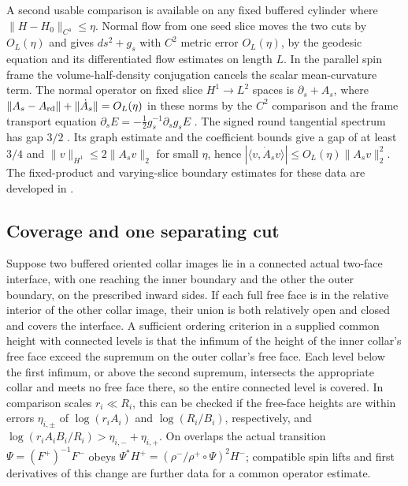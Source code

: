 \documentclass[11pt]{article}
\theoremstyle{definition}
\theoremstyle{remark}
\begin{document}
A second usable comparison is available on any fixed buffered cylinder where \(\|H-H_0\|_{C^4}\le\eta\). Normal flow from one seed slice moves the two cuts by \(O_L(\eta)\) and gives \(ds^2+g_s\) with \(C^2\) metric error \(O_L(\eta)\), by the geodesic equation and its differentiated flow estimates on length \(L\). In the parallel spin frame the volume-half-density conjugation cancels the scalar mean-curvature term. The normal operator on fixed slice \(H^1\to L^2\) spaces is \(\partial_s+A_s\), where \(\|A_s-A_{\rm rd}\|+\|\dot A_s\|=O_L(\eta)\) in these norms by the \(C^2\) comparison and the frame transport equation \(\partial_s E=-\tfrac12g_s^{-1}\partial_s g_s E\) \cite[(3.6), (4.1) and \S5]{BaerGauduchonMoroianu2005Cylinders}. The signed round tangential spectrum has gap \(3/2\) \cite[Theorem 1]{Bar1996SphereDirac}. Its graph estimate and the coefficient bounds give a gap of at least \(3/4\) and \(\|v\|_{H^1}\le2\|A_sv\|_2\) for small \(\eta\), hence \(|\langle v,\dot A_s v\rangle|\le O_L(\eta)\|A_sv\|_2^2\). The fixed-product and varying-slice boundary estimates for these data are developed in \cite{Baker2026DiracTransmission}.

\subsection{Coverage and one separating cut}

Suppose two buffered oriented collar images lie in a connected actual two-face interface, with one reaching the inner boundary and the other the outer boundary, on the prescribed inward sides. If each full free face is in the relative interior of the other collar image, their union is both relatively open and closed and covers the interface. A sufficient ordering criterion in a supplied common height with connected levels is that the infimum of the height of the inner collar's free face exceed the supremum on the outer collar's free face. Each level below the first infimum, or above the second supremum, intersects the appropriate collar and meets no free face there, so the entire connected level is covered. In comparison scales \(r_i\ll R_i\), this can be checked if the free-face heights are within errors \(\eta_{i,\pm}\) of \(\log(r_i A_i)\) and \(\log(R_i/B_i)\), respectively, and \(\log(r_i A_i B_i/R_i)>\eta_{i,-}+\eta_{i,+}\). On overlaps the actual transition \(\Psi=(F^+)^{-1}F^-\) obeys \(\Psi^*H^+=(\rho^-/\rho^+\circ\Psi)^2 H^-\); compatible spin lifts and first derivatives of this change are further data for a common operator estimate.
\end{document}
